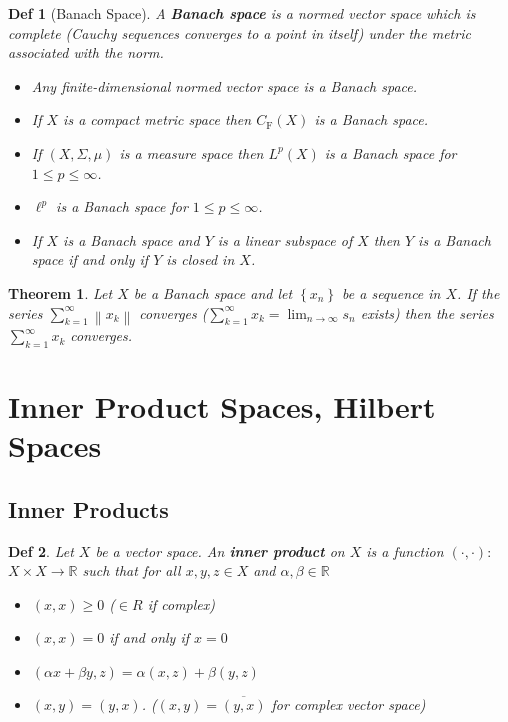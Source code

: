 \documentclass[10pt]{paper}
\newtheorem{theorem}{Theorem}[section]
\newtheorem{definition}{Def}[section]
\begin{document}
\begin{definition}[Banach Space]
    A \textbf{Banach space} is a normed vector space which is complete (Cauchy sequences converges to a point in itself) under the metric associated with the norm.

    \begin{itemize}
        \item Any finite-dimensional normed vector space is a Banach space.
        \item If $X$ is a compact metric space then $C_{\mathrm{F}}(X)$ is a Banach space.
        \item If $(X, \Sigma, \mu)$ is a measure space then $L^{p}(X)$ is a Banach space for $1 \leq p \leq \infty$.
        \item $\ell^{p}$ is a Banach space for $1 \leq p \leq \infty$.
        \item If $X$ is a Banach space and $Y$ is a linear subspace of $X$ then $Y$ is a Banach space if and only if $Y$ is closed in $X$.
    \end{itemize}
\end{definition}

\begin{theorem}
    Let $X$ be a Banach space and let $\left\{x_{n}\right\}$ be a sequence in $X$. If the series $\sum_{k=1}^{\infty}\left\|x_{k}\right\|$ converges ($\sum_{k=1}^{\infty} x_{k}=\lim _{n \rightarrow \infty} s_{n}$ exists) then the series $\sum_{k=1}^{\infty} x_{k}$ converges.
\end{theorem}

\section{Inner Product Spaces, Hilbert Spaces}

\subsection{Inner Products}
\begin{definition}
    Let $X$ be a vector space. An \textbf{inner product} on $X$ is a function $(\cdot, \cdot):$ $X \times X \rightarrow \mathbb{R}$ such that for all $x, y, z \in X$ and $\alpha, \beta \in \mathbb{R}$
    \begin{itemize}
        \item $(x, x) \geq 0$ ($\in R$ if complex)
        \item $(x, x)=0$ if and only if $x=0$
        \item $(\alpha x+\beta y, z)=\alpha(x, z)+\beta(y, z)$
        \item $(x, y)=(y, x)$. ($(x, y)=\overline{(y, x)}$ for complex vector space)
    \end{itemize}
\end{definition}
\end{document}
